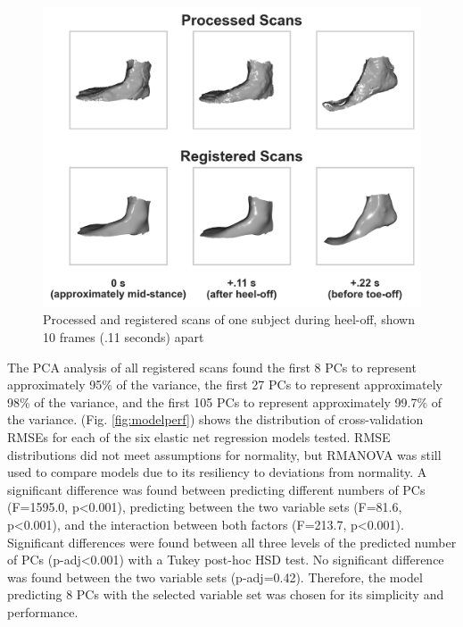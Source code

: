 \documentclass[defaultstyle,11pt]{comps}
\begin{document}
\begin{figure}
\hypertarget{fig:scans}{%
\centering
\includegraphics{../fig/SA2/scans.png}
\caption{Processed and registered scans of one subject during heel-off, shown 10 frames (.11 seconds) apart}\label{fig:scans}
}
\end{figure}

The PCA analysis of all registered scans found the first 8 PCs to represent approximately 95\% of the variance, the first 27 PCs to represent approximately 98\% of the variance, and the first 105 PCs to represent approximately 99.7\% of the variance.
(Fig. \ref{fig:modelperf}) shows the distribution of cross-validation RMSEs for each of the six elastic net regression models tested.
RMSE distributions did not meet assumptions for normality, but RMANOVA was still used to compare models due to its resiliency to deviations from normality.
A significant difference was found between predicting different numbers of PCs (F=1595.0, p\textless0.001), predicting between the two variable sets (F=81.6, p\textless0.001), and the interaction between both factors (F=213.7, p\textless0.001).
Significant differences were found between all three levels of the predicted number of PCs (p-adj\textless0.001) with a Tukey post-hoc HSD test.
No significant difference was found between the two variable sets (p-adj=0.42).
Therefore, the model predicting 8 PCs with the selected variable set was chosen for its simplicity and performance.
\end{document}
